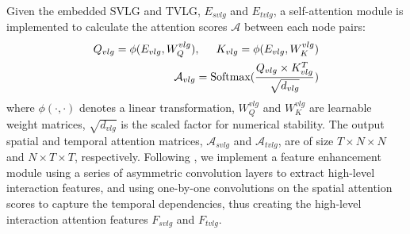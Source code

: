 \documentclass{article}
\begin{document}
Given the embedded SVLG and TVLG, $E_{svlg}$ and $E_{tvlg}$,
a self-attention module  \cite{Vaswani2017Transformer} is implemented to calculate the attention scores $\mathcal{A}$ between each node pairs:
\begin{equation}
    \begin{split}
        Q_{vlg} = \phi (E_{vlg}, W_{Q}^{vlg}), \hspace{0.5cm}
        K_{vlg} = \phi (E_{vlg}, W_{K}^{vlg}) \\
        \label{eq:attention}
        \mathcal{A}_{vlg} = \text{Softmax}(\frac{Q_{vlg}\times K_{vlg}^{T}}{\sqrt{d_{vlg}} }) \\
    \end{split}
\end{equation}
where $\phi (\cdot,\cdot)$ denotes a linear transformation, $W_{Q}^{vlg}$ and $W_{K}^{vlg}$ are learnable weight matrices, $\sqrt{d_{vlg}}$ is the scaled factor for numerical stability. The output spatial and temporal attention matrices,  $\mathcal{A}_{svlg}$ and $\mathcal{A}_{tvlg}$, are of size $T\times N\times N$ and $N\times T\times T$, respectively. 
Following \cite{shi2021sgcn}, we implement a feature enhancement module using a series of asymmetric convolution layers \cite{Szegedy2015AsyConv} to extract high-level interaction features, and using one-by-one convolutions on the spatial attention scores to capture the temporal dependencies, thus creating the high-level interaction attention features $F_{svlg}$ and $F_{tvlg}$. 
\end{document}
